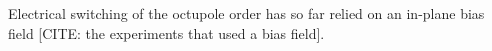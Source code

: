 \documentclass{article}
\begin{document}
Electrical switching of the octupole order has so far relied on an in-plane
bias field [CITE: the experiments that used a bias field].
\end{document}
